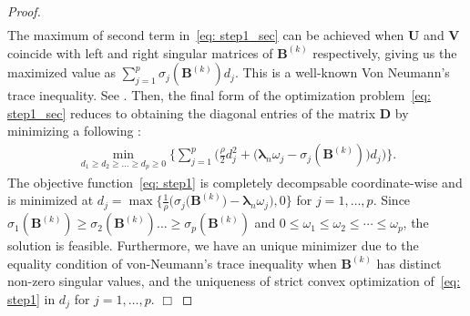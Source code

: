 \documentclass[alpha-refs]{wiley-article}
\begin{document}
\begin{proof}
\begin{align}
\end{align}
The maximum of second term in~\eqref{eq: step1_sec} can be achieved when $\boldsymbol{U}$ and $\boldsymbol{V}$ coincide with 
left and right singular matrices of $\boldsymbol{B}^{(k)}$ respectively, giving us the maximized value as $\sum_{j=1}^{p}\sigma_{j}(\boldsymbol{B}^{(k)})d_{j}$.
This is a well-known Von Neumann's trace inequality.
See \cite{von1937some,mirsky1975trace}. 
Then, the final form of the optimization problem~\eqref{eq: step1_sec} reduces to obtaining the diagonal entries of the matrix $\boldsymbol{D}$ by minimizing a following : 
\begin{align}
    \min_{d_{1}\geq d_{2}\geq \dots \geq d_{p} \geq 0 }\bigg\{ \sum_{j=1}^{p} \bigg( \frac{\rho}{2} d_{j}^{2} + \big( \boldsymbol{\lambda}_{n} \omega_{j}-\sigma_{j}(\boldsymbol{B}^{(k)}) \big) d_{j} \bigg)  \bigg\}. \label{eq: step1}
\end{align}
The objective function~\eqref{eq: step1} is completely decompsable coordinate-wise and is minimized at $d_{j}=\max\big\{\frac{1}{\rho}\big(\sigma_{j}(\boldsymbol{B}^{(k)}\big)-\boldsymbol{\lambda}_{n} \omega_{j}\big),0 \big\}$ for $j=1,\dots,p$.
Since $\sigma_{1}(\boldsymbol{B}^{(k)})\geq\sigma_{2}(\boldsymbol{B}^{(k)})\dots\geq\sigma_{p}(\boldsymbol{B}^{(k)})$ and $0\leq\omega_{1}\leq\omega_{2}\leq\cdots\leq\omega_{p}$, the solution is feasible.
Furthermore, we have an unique minimizer due to the equality condition of von-Neumann's trace inequality when $\boldsymbol{B}^{(k)}$ has distinct non-zero singular values, and the uniqueness of strict convex optimization  of~\eqref{eq: step1} in $d_{j}$ for $j=1,\dots,p$. 
\qquad \qquad \qquad \qquad \qquad \qquad \qquad \qquad \qquad \qquad \qquad \qquad \qquad \qquad \qquad \qquad 
\qquad \qquad \qquad \qquad \qquad \qquad \quad \quad $\Box$
\end{proof}
\end{document}

